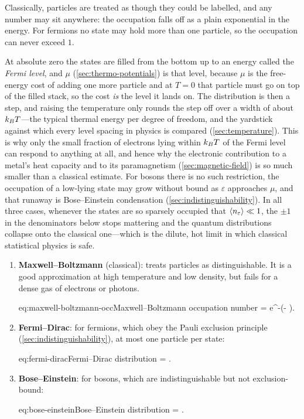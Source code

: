         Classically, particles are treated as though they could be labelled, and any number may sit anywhere: the occupation falls off as a plain exponential in the energy. For fermions no state may hold more than one particle, so the occupation can never exceed $1$.

        At absolute zero the states are filled from the bottom up to an energy called the \emph{Fermi level}, and $\mu$ (\cref{sec:thermo-potentials}) is that level, because $\mu$ is the free-energy cost of adding one more particle and at $T=0$ that particle must go on top of the filled stack, so the cost \emph{is} the level it lands on. The distribution is then a step, and raising the temperature only rounds the step off over a width of about $k_{B} T$---the typical thermal energy per degree of freedom, and the yardstick against which every level spacing in physics is compared (\cref{sec:temperature}). This is why only the small fraction of electrons lying within $k_{B} T$ of the Fermi level can respond to anything at all, and hence why the electronic contribution to a metal's heat capacity and to its paramagnetism (\cref{sec:magnetic-field}) is so much smaller than a classical estimate. For bosons there is no such restriction, the occupation of a low-lying state may grow without bound as $\varepsilon$ approaches $\mu$, and that runaway is Bose--Einstein condensation (\cref{sec:indistinguishability}). In all three cases, whenever the states are so sparsely occupied that $\langle n_\varepsilon \rangle \ll 1$, the $\pm1$ in the denominators below stops mattering and the quantum distributions collapse onto the classical one---which is the dilute, hot limit in which classical statistical physics is safe.

        \begin{enumerate}
            \item \textbf{Maxwell--Boltzmann} (classical): treats particles as distinguishable. It is a good approximation at high temperature and low density, but fails for a dense gas of electrons or photons.
            \begin{keyeq}{eq:maxwell-boltzmann-occ}{Maxwell--Boltzmann occupation number}
                 = e^{-\beta(\varepsilon - \mu)}.
            \end{keyeq}
            \item \textbf{Fermi--Dirac}: for fermions, which obey the Pauli exclusion principle (\cref{sec:indistinguishability}), at most one particle per state:
            \begin{keyeq}{eq:fermi-dirac}{Fermi--Dirac distribution}
                 = .
            \end{keyeq}
            \item \textbf{Bose--Einstein}: for bosons, which are indistinguishable but not exclusion-bound:
            \begin{keyeq}{eq:bose-einstein}{Bose--Einstein distribution}
                 = .
            \end{keyeq}
        \end{enumerate}

